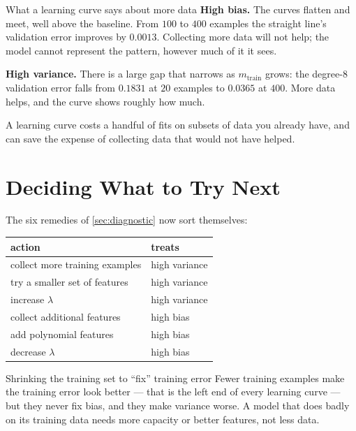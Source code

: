 \begin{keyinsight}{What a learning curve says about more data}
\textbf{High bias.} The curves flatten and meet, well above the baseline. From
$100$ to $400$ examples the straight line's validation error improves by
$0.0013$. Collecting more data will not help; the model cannot represent the
pattern, however much of it it sees.

\textbf{High variance.} There is a large gap that narrows as $m_{\text{train}}$
grows: the degree-$8$ validation error falls from $0.1831$ at $20$ examples to
$0.0365$ at $400$. More data helps, and the curve shows roughly how much.

A learning curve costs a handful of fits on subsets of data you already have,
and can save the expense of collecting data that would not have helped.
\end{keyinsight}

\section{Deciding What to Try Next}
\label{sec:what-next}

The six remedies of \cref{sec:diagnostic} now sort themselves:

\begin{center}
\small
\renewcommand{\arraystretch}{1.25}
\begin{tabular}{@{}L{5.0cm}L{4.0cm}@{}}
\toprule
action & treats\\
\midrule
collect more training examples & high variance\\
try a smaller set of features & high variance\\
increase $\lambda$ & high variance\\
\midrule
collect additional features & high bias\\
add polynomial features & high bias\\
decrease $\lambda$ & high bias\\
\bottomrule
\end{tabular}
\end{center}

\begin{pitfall}{Shrinking the training set to ``fix'' training error}
Fewer training examples make the training error look better --- that is the left
end of every learning curve --- but they never fix bias, and they make variance
worse. A model that does badly on its training data needs more capacity or
better features, not less data.
\end{pitfall}

